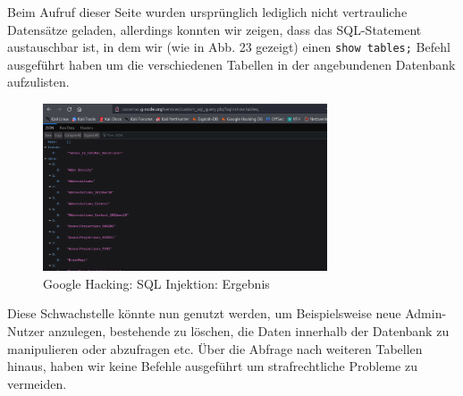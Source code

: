 \documentclass{article}
\begin{document}
Beim Aufruf dieser Seite wurden ursprünglich lediglich nicht vertrauliche Datensätze geladen,
allerdings konnten wir zeigen, dass das SQL-Statement austauschbar ist, in dem wir (wie in Abb. 23 gezeigt)
einen \texttt{show tables;} Befehl ausgeführt haben um die verschiedenen Tabellen in der angebundenen Datenbank
aufzulisten.

\begin{figure}[H]
	\includegraphics[width=0.75\textwidth]{images/23}
	\centering
	\caption{Google Hacking: SQL Injektion: Ergebnis}
\end{figure}

Diese Schwachstelle könnte nun genutzt werden, um Beispielsweise neue Admin-Nutzer anzulegen,
bestehende zu löschen, die Daten innerhalb der Datenbank zu manipulieren oder abzufragen etc.
Über die Abfrage nach weiteren Tabellen hinaus, haben wir keine Befehle ausgeführt um strafrechtliche
Probleme zu vermeiden.
\end{document}
